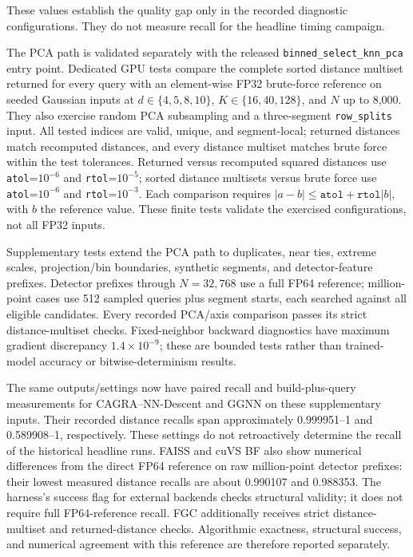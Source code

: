 \documentclass[final,3p,11pt]{elsarticle}
\begin{document}
These values establish the quality gap only in the recorded diagnostic
configurations. They do not measure recall for the headline timing campaign.

The PCA path is validated separately with the released
\texttt{binned\_select\_knn\_pca} entry point. Dedicated GPU tests compare
the complete sorted distance multiset returned for every query with an
element-wise FP32 brute-force reference on seeded Gaussian inputs at $d\in\{4,5,8,10\}$,
$K\in\{16,40,128\}$, and $N$ up to 8,000. They also exercise random PCA
subsampling and a three-segment \texttt{row\_splits} input. All tested
indices are valid, unique, and segment-local; returned distances match
recomputed distances, and every distance multiset matches brute force within
the test tolerances. Returned versus recomputed squared distances use
\texttt{atol}=$10^{-6}$ and \texttt{rtol}=$10^{-5}$; sorted distance
multisets versus brute force use \texttt{atol}=$10^{-6}$ and
\texttt{rtol}=$10^{-3}$. Each comparison requires
$|a-b|\le\texttt{atol}+\texttt{rtol}|b|$, with $b$ the reference value.
These finite tests validate the exercised configurations, not all FP32 inputs.

Supplementary tests extend the PCA path to duplicates, near ties, extreme
scales, projection/bin boundaries, synthetic segments, and detector-feature
prefixes. Detector prefixes through $N{=}32{,}768$ use a full FP64 reference;
million-point cases use 512 sampled queries plus segment starts, each
searched against all eligible candidates. Every recorded PCA/axis comparison passes its strict
distance-multiset checks. Fixed-neighbor backward diagnostics have maximum
gradient discrepancy $1.4\times10^{-9}$; these are bounded tests rather
than trained-model accuracy or bitwise-determinism results.

The same outputs/settings now have paired recall and build-plus-query
measurements for CAGRA--NN-Descent and GGNN on these supplementary inputs.
Their recorded distance recalls span approximately 0.999951--1 and
0.589908--1, respectively. These settings do not retroactively determine
the recall of the historical headline runs. FAISS and cuVS BF also show
numerical differences from the direct FP64 reference on raw million-point
detector prefixes: their lowest measured distance recalls are about
0.990107 and 0.988353. The harness's success flag for external backends
checks structural validity; it does not require full FP64-reference recall.
FGC additionally receives strict distance-multiset and returned-distance
checks. Algorithmic exactness, structural success, and numerical agreement
with this reference are therefore reported separately.
\end{document}
